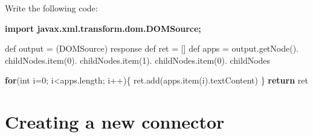\documentclass[]{report}
\newenvironment{Shaded}{}{}
\newcommand{\KeywordTok}[1]{\textcolor[rgb]{0.00,0.44,0.13}{\textbf{{#1}}}}
\newcommand{\DataTypeTok}[1]{\textcolor[rgb]{0.56,0.13,0.00}{{#1}}}
\newcommand{\DecValTok}[1]{\textcolor[rgb]{0.25,0.63,0.44}{{#1}}}
\newcommand{\FunctionTok}[1]{\textcolor[rgb]{0.02,0.16,0.49}{{#1}}}
\newcommand{\NormalTok}[1]{{#1}}
\begin{document}
Write the following code:

\begin{Shaded}
\begin{Highlighting}[]
\KeywordTok{import javax.xml.transform.dom.DOMSource;}

\NormalTok{def output = (DOMSource) response}
\NormalTok{def ret = []}
\NormalTok{def apps =}
   \NormalTok{output.}\FunctionTok{getNode}\NormalTok{().}
   \NormalTok{childNodes.}\FunctionTok{item}\NormalTok{(}\DecValTok{0}\NormalTok{).}
   \NormalTok{childNodes.}\FunctionTok{item}\NormalTok{(}\DecValTok{1}\NormalTok{).}
   \NormalTok{childNodes.}\FunctionTok{item}\NormalTok{(}\DecValTok{0}\NormalTok{).}
   \NormalTok{childNodes}

\KeywordTok{for}\NormalTok{(}\DataTypeTok{int} \NormalTok{i=}\DecValTok{0}\NormalTok{; i<apps.}\FunctionTok{length}\NormalTok{; i++)\{}
   \NormalTok{ret.}\FunctionTok{add}\NormalTok{(apps.}\FunctionTok{item}\NormalTok{(i).}\FunctionTok{textContent}\NormalTok{)}
\NormalTok{\}}
\KeywordTok{return} \NormalTok{ret}
\end{Highlighting}
\end{Shaded}

\section{Creating a new connector}
\end{document}
